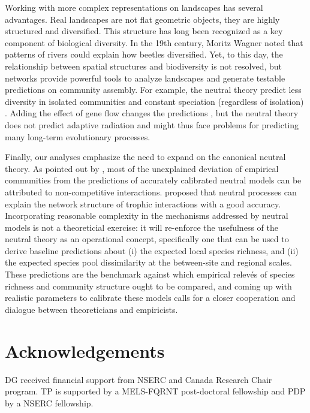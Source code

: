 \documentclass[12pt]{article}
\begin{document}
Working with more complex representations on landscapes has several advantages.
Real landscapes are not flat geometric objects, they are highly structured and
diversified. This structure has long been recognized as a key component of
biological diversity. In the 19th century, Moritz Wagner noted that patterns of
rivers \cite{coy04} could explain how beetles diversified. Yet, to this day, the
relationship between spatial structures and biodiversity is not resolved, but
networks provide powerful tools to analyze landscapes and generate testable
predictions on community assembly. For example, the neutral theory predict less
diversity in isolated communities and constant speciation (regardless of
isolation) \parencite{Economo2008}. Adding the effect of gene flow changes the
predictions \parencite{Desjardins2012b}, but the neutral theory does not predict
adaptive radiation and might thus face problems for predicting many long-term
evolutionary processes.

Finally, our analyses emphasize the need to expand on the canonical neutral
theory. As pointed out by \textcite{Wootton2005}, most of the unexplained
deviation of empirical communities from the predictions of accurately calibrated
neutral models can be attributed to non-competitive interactions. \textcite{Canard2012}
proposed that neutral processes can explain the network structure of trophic
interactions with a good accuracy. Incorporating reasonable complexity in the
mechanisms addressed by neutral models is not a theoreticial exercise: it will
re-enforce the usefulness of the neutral theory as an operational concept,
specifically one that can be used to derive baseline predictions about (i) the
expected local species richness, and (ii) the expected species pool
dissimilarity at the between-site and regional scales. These predictions are the
benchmark against which empirical relev\'es of species richness and community
structure ought to be compared, and coming up with realistic parameters to
calibrate these models calls for a closer cooperation and dialogue between
theoreticians and empiricists.

\section*{Acknowledgements}
DG received financial support from NSERC and Canada Research Chair program. TP
is supported by a MELS-FQRNT post-doctoral fellowship and PDP by a NSERC
fellowship.
\newpage
\end{document}
